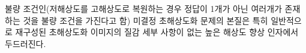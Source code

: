 \documentclass[10pt,twocolumn,letterpaper]{article}
\newcommand{\kor}[1]{#1}
\newcommand{\eng}[1]{}
\begin{document}
\eng{
The ill-posed nature of the underdetermined \ac{SR} problem is particularly pronounced for high upscaling factors, for which texture detail in the reconstructed \ac{SR} images is typically absent.
}\kor{
불량 조건인(\ac{저해상도}를 \ac{고해상도}로 복원하는 경우 정답이 1개가 아닌 여러개가 존재하는 것을 불량 조건을 가진다고 함) 미결정 \ac{초해상도화} 문제의 본질은 특히 일반적으로 재구성된 \ac{초해상도화} 이미지의 질감 세부 사항이 없는 높은 해상도 향상 인자에서 두드러진다.
}
%
%
\end{document}
